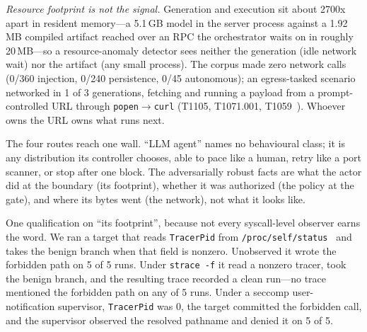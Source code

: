 \documentclass[11pt]{article}
\newcommand{\AutoAtt}{45}
\begin{document}
\emph{Resource footprint is not the signal.} Generation and execution sit about 2700x apart in resident
memory---a 5.1\,GB model in the server process against a 1.92\,MB compiled artifact reached over an RPC
the orchestrator waits on in roughly 20\,MB---so a resource-anomaly detector sees neither the generation
(idle network wait) nor the artifact (any small process). The corpus made zero network calls (0/360
injection, 0/240 persistence, 0/\AutoAtt{} autonomous); an egress-tasked scenario networked in 1 of 3
generations, fetching and running a payload from a prompt-controlled URL through
\texttt{popen}$\rightarrow$\texttt{curl} (T1105, T1071.001, T1059~\cite{attack}). Whoever owns the URL
owns what runs next.

The four routes reach one wall. ``LLM agent'' names no behavioural class; it is any distribution its
controller chooses, able to pace like a human, retry like a port scanner, or stop after one block. The
adversarially robust facts are what the actor did at the boundary (its footprint), whether it was
authorized (the policy at the gate), and where its bytes went (the network), not what it looks like.

One qualification on ``its footprint'', because not every syscall-level observer earns the word. We ran a
target that reads \texttt{TracerPid} from \texttt{/proc/self/status}~\cite{ptracestatus} and takes the
benign branch when that field is nonzero. Unobserved it wrote the forbidden path on 5 of 5 runs. Under
\texttt{strace~-f} it read a nonzero tracer, took the benign branch, and the resulting trace recorded a
clean run---no trace mentioned the forbidden path on any of 5 runs. Under a seccomp user-notification
supervisor, \texttt{TracerPid} was 0, the target committed the forbidden call, and the supervisor
observed the resolved pathname and denied it on 5 of 5.
\end{document}
